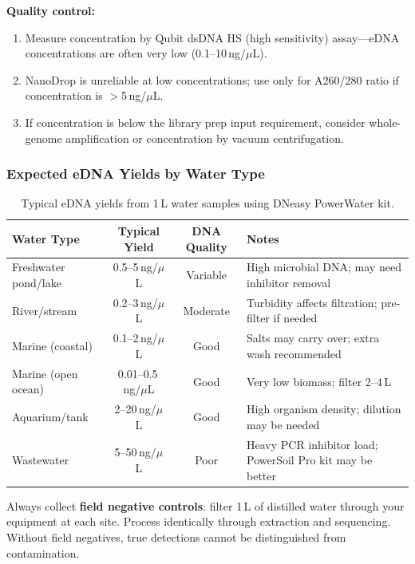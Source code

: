 \begin{protocolbox}[title={Protocol: eDNA Extraction from Water (DNeasy PowerWater Kit)}]
\textbf{Quality control:}
\begin{enumerate}[nosep]
  \item Measure concentration by Qubit dsDNA HS (high sensitivity) assay---eDNA concentrations are often very low (0.1--10\,ng/$\mu$L).
  \item NanoDrop is unreliable at low concentrations; use only for A260/280 ratio if concentration is $>$5\,ng/$\mu$L.
  \item If concentration is below the library prep input requirement, consider whole-genome amplification or concentration by vacuum centrifugation.
\end{enumerate}
\end{protocolbox}

\subsubsection{Expected eDNA Yields by Water Type}

\begin{table}[htbp]
\centering
\caption{Typical eDNA yields from 1\,L water samples using DNeasy PowerWater kit.}
\label{tab:protocols:edna_yields}
\small
\renewcommand{\arraystretch}{1.3}
\begin{tabularx}{\textwidth}{@{}l c c X@{}}
\toprule
\textbf{Water Type} & \textbf{Typical Yield} & \textbf{DNA Quality} & \textbf{Notes} \\
\midrule
Freshwater pond/lake & 0.5--5\,ng/$\mu$L & Variable & High microbial DNA; may need inhibitor removal \\
\addlinespace
River/stream & 0.2--3\,ng/$\mu$L & Moderate & Turbidity affects filtration; pre-filter if needed \\
\addlinespace
Marine (coastal) & 0.1--2\,ng/$\mu$L & Good & Salts may carry over; extra wash recommended \\
\addlinespace
Marine (open ocean) & 0.01--0.5\,ng/$\mu$L & Good & Very low biomass; filter 2--4\,L \\
\addlinespace
Aquarium/tank & 2--20\,ng/$\mu$L & Good & High organism density; dilution may be needed \\
\addlinespace
Wastewater & 5--50\,ng/$\mu$L & Poor & Heavy PCR inhibitor load; PowerSoil Pro kit may be better \\
\bottomrule
\end{tabularx}
\end{table}

\begin{tipbox}[title={Field Controls for eDNA}]
Always collect \textbf{field negative controls}: filter 1\,L of distilled water through your equipment at each site. Process identically through extraction and sequencing. Without field negatives, true detections cannot be distinguished from contamination.
\end{tipbox}

